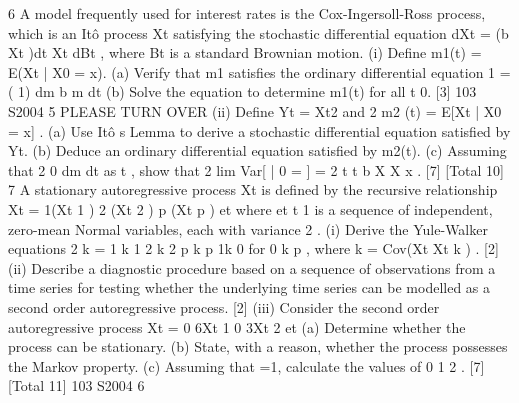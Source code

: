 
6 A model frequently used for interest rates is the Cox-Ingersoll-Ross process, which is
an Itô process Xt satisfying the stochastic differential equation
dXt = (b Xt )dt Xt dBt ,
where Bt is a standard Brownian motion.
(i) Define m1(t) = E(Xt | X0 = x).
(a) Verify that m1 satisfies the ordinary differential equation
1
= ( 1)
dm
b m
dt
(b) Solve the equation to determine m1(t) for all t 0. [3]
103 S2004 5 PLEASE TURN OVER
(ii) Define Yt = Xt2 and 2
m2 (t) = E[Xt | X0 = x] .
(a) Use Itô s Lemma to derive a stochastic differential equation satisfied
by Yt.
(b) Deduce an ordinary differential equation satisfied by m2(t).
(c) Assuming that 2 0
dm
dt
as t , show that
2
lim Var[ | 0 = ] =
2 t t
b
X X x .
[7]
[Total 10]
7 A stationary autoregressive process Xt is defined by the recursive relationship
Xt = 1(Xt 1 ) 2 (Xt 2 ) p (Xt p ) et
where {et t 1} is a sequence of independent, zero-mean Normal variables, each
with variance 2 .
(i) Derive the Yule-Walker equations
2
k = 1 k 1 2 k 2 p k p 1k 0
for 0 k p , where k = Cov(Xt Xt k ) . [2]
(ii) Describe a diagnostic procedure based on a sequence of observations from a
time series for testing whether the underlying time series can be modelled as a
second order autoregressive process. [2]
(iii) Consider the second order autoregressive process
Xt = 0 6Xt 1 0 3Xt 2 et
(a) Determine whether the process can be stationary.
(b) State, with a reason, whether the process possesses the Markov
property.
(c) Assuming that =1, calculate the values of 0 1 2 . [7]
[Total 11]
103 S2004 6


